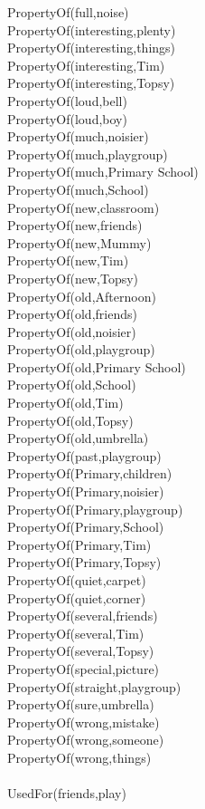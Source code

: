\begin{multicols}{2}
\begin{footnotesize}
PropertyOf(full,noise) \\
PropertyOf(interesting,plenty) \\
PropertyOf(interesting,things) \\
PropertyOf(interesting,Tim) \\
PropertyOf(interesting,Topsy) \\
PropertyOf(loud,bell) \\
PropertyOf(loud,boy) \\
PropertyOf(much,noisier) \\
PropertyOf(much,playgroup) \\
PropertyOf(much,Primary School) \\
PropertyOf(much,School) \\
PropertyOf(new,classroom) \\
PropertyOf(new,friends) \\
PropertyOf(new,Mummy) \\
PropertyOf(new,Tim) \\
PropertyOf(new,Topsy) \\
PropertyOf(old,Afternoon) \\
PropertyOf(old,friends) \\
PropertyOf(old,noisier) \\
PropertyOf(old,playgroup) \\
PropertyOf(old,Primary School) \\
PropertyOf(old,School) \\
PropertyOf(old,Tim) \\
PropertyOf(old,Topsy) \\
PropertyOf(old,umbrella) \\
PropertyOf(past,playgroup) \\
PropertyOf(Primary,children) \\
PropertyOf(Primary,noisier) \\
PropertyOf(Primary,playgroup) \\
PropertyOf(Primary,School) \\
PropertyOf(Primary,Tim) \\
PropertyOf(Primary,Topsy) \\
PropertyOf(quiet,carpet) \\
PropertyOf(quiet,corner) \\
PropertyOf(several,friends) \\
PropertyOf(several,Tim) \\
PropertyOf(several,Topsy) \\
PropertyOf(special,picture) \\
PropertyOf(straight,playgroup) \\
PropertyOf(sure,umbrella) \\
PropertyOf(wrong,mistake) \\
PropertyOf(wrong,someone) \\
PropertyOf(wrong,things) \\
~\\
UsedFor(friends,play) \\
\end{footnotesize}
\end{multicols}

